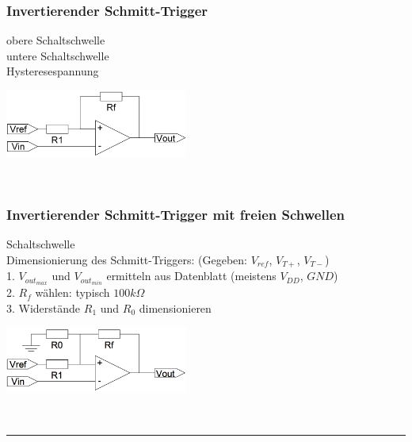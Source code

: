         \subsubsection{Invertierender Schmitt-Trigger}
            \begin{minipage}[T]{13cm}
                obere Schaltschwelle
                \hspace{10.8mm}\\
                untere Schaltschwelle
                \hspace{9.6mm}\\
                Hysteresespannung
                \hspace{12.8mm}\\
            \end{minipage} 
            \begin{minipage}{6cm}
                \includegraphics[width=6cm]{./bilder/i-schmitt.png} 
            \end{minipage}\\
            
        \subsubsection{Invertierender Schmitt-Trigger mit freien Schwellen}
        \begin{minipage}[T]{13cm}
            Schaltschwelle
            \hspace{20.8mm}\\
            
            Dimensionierung des Schmitt-Triggers: (Gegeben: $V_{ref}$, $V_{T+}$, $V_{T-}$)\\
            1. $V_{out_{max}}$ und $V_{out_{min}}$ ermitteln aus Datenblatt (meistens $V_{DD}$, $GND$)\\
            2. $R_f$ w\"ahlen: typisch $100 k\Omega$\\
            3. Widerst\"ande $R_1$ und $R_0$ dimensionieren\\
        \end{minipage} 
        \begin{minipage}{6cm}
            \includegraphics[width=6cm]{./bilder/i-schmittFreieSchwellen.png} 
        \end{minipage}\\
\hrule

